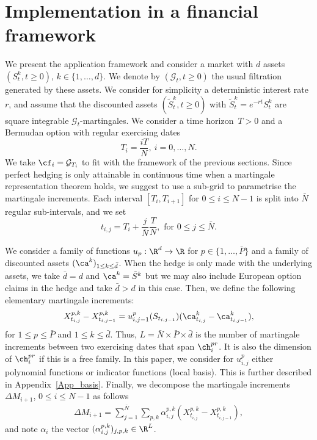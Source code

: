 \section{Implementation in a financial framework}\label{Sec_Implementation}


We present the application framework and consider a market with $d$ assets $(S^k_t,t\ge 0)$, $k\in\{1,\dots, d\}$. We denote by $(\mathcal{G}_t,t\ge 0)$ the usual filtration generated by these assets. We consider for simplicity a deterministic interest rate~$r$, and assume that the discounted assets $(\tilde{S}^k_t,t\ge 0)$ with $\tilde{S}_t^k=e^{-rt}S_t^k$ are square integrable $\mathcal{G}_t$-martingales. 
We consider a time horizon~$T>0$ and a Bermudan option with regular exercising dates
$$T_i=\frac{iT}{N}, \ i=0,\dots,N.$$ We take $\cf_i=\mathcal{G}_{T_i}$ to fit with the framework of the previous sections. 
Since perfect hedging is only attainable in continuous time when a martingale representation theorem holds, we suggest to use a sub-grid to parametrise the martingale increments. Each interval $[T_i, T_{i+1}]$ for $0 \le i \le  N-1 $ is split into $\bar{N}$ regular sub-intervals, and we set 
\begin{equation}\label{def_subticks} t_{i,j}=T_i+\frac{j}{\bar{N}} \frac{T}{N}, \text{ for }0 \le j \le \bar{N}.\end{equation}

We consider a family of functions $u_p:\R^d \to \R$ for $p\in \{1,\dots,\bar{P}\}$ and a family of discounted assets $(\ca^k)_{1\le k\le \bar{d}}$. When the hedge is only made with the underlying assets, we take $\bar{d}=d$ and  $\ca^k=\tilde{S}^k$ but we may also include European option claims in the hedge and take $\bar{d}>d$ in this case. Then, we define the  following elementary martingale increments:
\begin{equation}\label{def_mg_incr}
  X^{{p},k}_{t_{i,j}} - X^{{p},k}_{t_{i,j-1}} =  u^{p}_{i,j-1} (S_{t_{i,j-1}}) (\ca^k_{t_{i,j}}- \ca^k_{t_{i,j-1}}),
\end{equation}
for $1\le p\le \bar{P}$ and $1\le k\le \bar{d}$. Thus,  $L=\bar{N} \times \bar{P} \times \bar{d}$  is the number of martingale increments between two exercising dates that span $\ch_i^{pr}$. It is also the dimension of $\ch_i^{pr}$ if this is a free family. In this paper, we consider for $u^p_{i,j}$ either polynomial functions or indicator functions (local basis). This is further described in Appendix~\ref{App_basis}.
Finally, we decompose the martingale increments $\Delta M_{i+1}$, $0\le i \le N-1$ as follows
\begin{align}\label{def_DeltaMi}
  \Delta M_{i+1} =  \sum_{j=1}^{\bar{N}}\sum_{{{ p},k}} \alpha_{i,j}^{{ p},k}  (X^{{ p},k}_{t_{i, j}} - X^{{ p},k}_{t_{i, j-1}}),
\end{align}
and note $\alpha_i$ the vector $(\alpha_{i,j}^{{ p},k})_{j,p,k} \in \R^L$.


